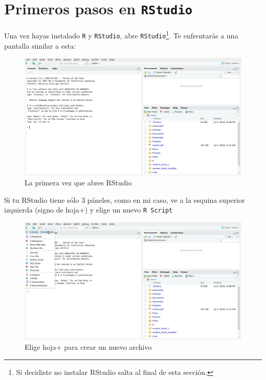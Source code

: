 \documentclass[]{tufte-book}
\begin{document}
\hypertarget{primeros-pasos-en-rstudio}{%
\chapter{\texorpdfstring{Primeros pasos en
\texttt{RStudio}}{Primeros pasos en RStudio}}\label{primeros-pasos-en-rstudio}}

Una vez hayas instalado \texttt{R} y \texttt{RStudio}, abre
\texttt{RStudio}\footnote{Si decidiste no instalar RStudio salta al
  final de esta sección.}. Te enfrentarás a una pantalla similar a esta:

\begin{figure}
\includegraphics[width=40in]{images/RStudio1} \caption[La primera vez que abres RStudio]{La primera vez que abres RStudio}\label{fig:fig-main}
\end{figure}

Si tu RStudio tiene sólo 3 páneles, como en mi caso, ve a la esquina
superior izquierda (signo de hoja+) y elige un nuevo \texttt{R\ Script}

\begin{figure}
\includegraphics[width=40in]{images/RStudio2} \caption[Elige hoja+ para crear un nuevo archivo]{Elige hoja+ para crear un nuevo archivo}\label{fig:unnamed-chunk-10}
\end{figure}
\end{document}
